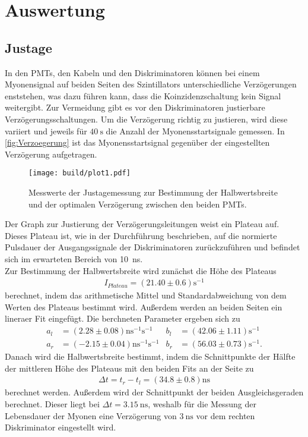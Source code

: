 \section{Auswertung}
\label{sec:Auswertung}

\subsection{Justage}
\label{subsec:Justage}
In den PMTs, den Kabeln und den  Diskriminatoren können bei einem Myonensignal auf beiden Seiten des Szintillators unterschiedliche Verzögerungen
enststehen, was dazu führen kann, dass die Koinzidenzschaltung kein Signal weitergibt.
Zur Vermeidung gibt es vor den Diskriminatoren justierbare Verzögerungsschaltungen. Um die Verzögerung richtig zu justieren, wird diese variiert und jeweils für $\qty{40}{\second}$
die Anzahl der Myonensstartsignale gemessen. In \autoref{fig:Verzoegerung} ist das Myonensstartsignal gegenüber der eingestellten Verzögerung aufgetragen.
\begin{figure}[H]
  \centering
  \texttt{[image: build/plot1.pdf]}
  \caption {Messwerte der Justagemessung zur Bestimmung der Halbwertsbreite und der optimalen Verzögerung zwischen den beiden PMTs.}
  \label{fig:Verzoegerung}
\end{figure}
Der Graph zur Justierung der Verzögerungsleitungen weist ein Plateau auf.
Dieses Plateau ist, wie in der Durchführung beschrieben, auf die normierte Pulsdauer der Ausgangssignale der Diskriminatoren zurückzuführen und befindet sich im erwarteten Bereich von \SI{10}{\nano \second}. \\
Zur Bestimmung der Halbwertsbreite wird zunächst die Höhe des Plateaus
\begin{align*}
    I_{Plateau} = (21.40 \pm 0.6) \si{\second^{-1}}
\end{align*}
berechnet, indem das arithmetische Mittel und Standardabweichung von dem Werten des Plateaus bestimmt wird.
Außerdem werden an beiden Seiten ein lineraer Fit eingefügt.
Die berchneten Parameter ergeben sich zu 
\begin{align}
  a_l &= (2.28 \pm 0.08)  \si{\nano\second^{-1}\second^{-1}} & b_l &= (42.06 \pm 1.11) \si{\second^{-1}} \\
  a_r &= (-2.15 \pm 0.04) \si{\nano\second^{-1}\second^{-1}} & b_r &= (56.03 \pm 0.73) \si{\second^{-1}}.
\end{align}
Danach wird die Halbwertsbreite bestimmt, indem die Schnittpunkte der Hälfte der mittleren Höhe des Plateaus mit den beiden Fits an der Seite zu
\begin{align*}
   \Delta t = t_r - t_l = (34.8 \pm 0.8) \si{\nano\second}
\end{align*}
berechnet werden.
Außerdem wird der Schnittpunkt der beiden Ausgleichsgeraden berechnet.
Dieser liegt bei $\Delta t = \qty{3.15}{\nano\second}$, weshalb für die Messung der Lebensdauer der Myonen eine Verzögerung von $\qty{3}{\nano\second}$
vor dem rechten Diskriminator eingestellt wird.


